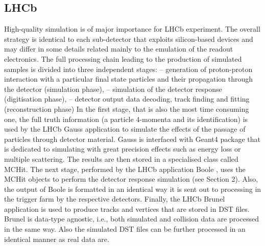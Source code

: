 \subsection{LHCb}
\label{sec:LHCb}
High-quality simulation is of major importance for LHCb experiment. The overall strategy is identical to
each sub-detector that exploits silicon-based devices and may differ in some details related mainly to the
emulation of the readout electronics. The full processing chain leading to the production of simulated
samples is divided into three independent stages:
– generation of proton-proton interaction with a particular final state particles and their propagation
through the detector (simulation phase),
– simulation of the detector response (digitisation phase),
– detector output data decoding, track finding and fitting (reconstruction phase)
In the first stage, that is also the most time consuming one, the full truth information (a particle
4-momenta and its identification) is used by the LHCb Gauss application \cite{lhcb1} to simulate the effects of
the passage of particles through detector material. Gauss is interfaced with Geant4 \cite{lhcb3} package that is
dedicated to simulating with great precision effects such as energy loss or multiple scattering. The results
are then stored in a specialised class called MCHit. The next stage, performed by the LHCb application
Boole \cite{lhcb2}, uses the MCHit objects to perform the detector response simulation (see Section 2). Also,
the output of Boole is formatted in an identical way it is sent out to processing in the trigger farm by the
respective detectors. Finally, the LHCb Brunel application \cite{lhcb4} is used to produce tracks and vertices that
are stored in DST files. Brunel is data-type agnostic, i.e., both simulated and collision data are processed
in the same way. Also the simulated DST files can be further processed in an identical manner as real
data are.

